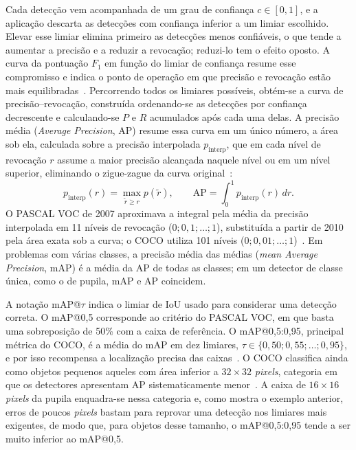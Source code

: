 Cada detecção vem acompanhada de um grau de confiança $c \in [0, 1]$, e a aplicação descarta as detecções com confiança inferior a um limiar escolhido. Elevar esse limiar elimina primeiro as detecções menos confiáveis, o que tende a aumentar a precisão e a reduzir a revocação; reduzi-lo tem o efeito oposto. A curva da pontuação $F_1$ em função do limiar de confiança resume esse compromisso e indica o ponto de operação em que precisão e revocação estão mais equilibradas~\cite{ultralytics_metrics}. Percorrendo todos os limiares possíveis, obtém-se a curva de precisão--revocação, construída ordenando-se as detecções por confiança decrescente e calculando-se $P$ e $R$ acumulados após cada uma delas. A precisão média (\textit{Average Precision}, AP) resume essa curva em um único número, a área sob ela, calculada sobre a precisão interpolada $p_{\text{interp}}$, que em cada nível de revocação $r$ assume a maior precisão alcançada naquele nível ou em um nível superior, eliminando o zigue-zague da curva original~\cite{everingham2010pascal}:
\begin{equation}
    p_{\text{interp}}(r) = \max_{\tilde{r} \ge r} p(\tilde{r}), \qquad
    \mathrm{AP} = \int_0^1 p_{\text{interp}}(r)\,dr.
    \label{eq:ap}
\end{equation}
O PASCAL VOC de 2007 aproximava a integral pela média da precisão interpolada em 11 níveis de revocação ($0; 0{,}1; \ldots; 1$), substituída a partir de 2010 pela área exata sob a curva; o COCO utiliza 101 níveis ($0; 0{,}01; \ldots; 1$)~\cite{padilla2020survey}. Em problemas com várias classes, a precisão média das médias (\textit{mean Average Precision}, mAP) é a média da AP de todas as classes; em um detector de classe única, como o de pupila, mAP e AP coincidem.

A notação mAP@$\tau$ indica o limiar de IoU usado para considerar uma detecção correta. O mAP@0,5 corresponde ao critério do PASCAL VOC, em que basta uma sobreposição de 50\% com a caixa de referência. O mAP@0,5:0,95, principal métrica do COCO, é a média do mAP em dez limiares, $\tau \in \{0{,}50; 0{,}55; \ldots; 0{,}95\}$, e por isso recompensa a localização precisa das caixas~\cite{lin2014microsoft}. O COCO classifica ainda como objetos pequenos aqueles com área inferior a $32 \times 32$ \textit{pixels}, categoria em que os detectores apresentam AP sistematicamente menor~\cite{lin2014microsoft}. A caixa de $16 \times 16$ \textit{pixels} da pupila enquadra-se nessa categoria e, como mostra o exemplo anterior, erros de poucos \textit{pixels} bastam para reprovar uma detecção nos limiares mais exigentes, de modo que, para objetos desse tamanho, o mAP@0,5:0,95 tende a ser muito inferior ao mAP@0,5.

